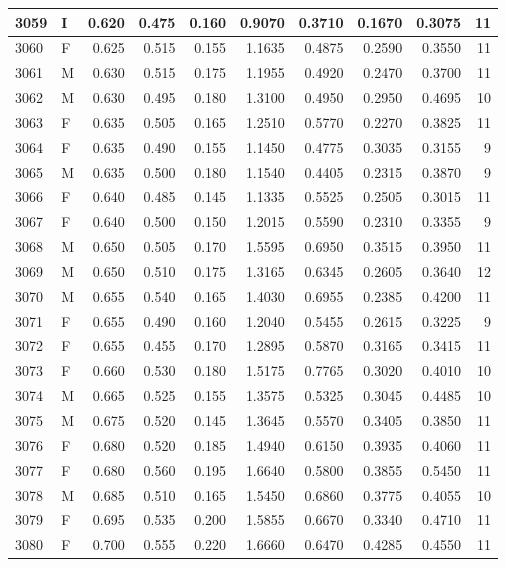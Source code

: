\documentclass[9pt,twocolumn,twoside,]{pnas-new}
\begin{document}
\begin{tabular}{l|l|r|r|r|r|r|r|r|r}
\hline
3059 & I & 0.620 & 0.475 & 0.160 & 0.9070 & 0.3710 & 0.1670 & 0.3075 & 11\\
\hline
3060 & F & 0.625 & 0.515 & 0.155 & 1.1635 & 0.4875 & 0.2590 & 0.3550 & 11\\
\hline
3061 & M & 0.630 & 0.515 & 0.175 & 1.1955 & 0.4920 & 0.2470 & 0.3700 & 11\\
\hline
3062 & M & 0.630 & 0.495 & 0.180 & 1.3100 & 0.4950 & 0.2950 & 0.4695 & 10\\
\hline
3063 & F & 0.635 & 0.505 & 0.165 & 1.2510 & 0.5770 & 0.2270 & 0.3825 & 11\\
\hline
3064 & F & 0.635 & 0.490 & 0.155 & 1.1450 & 0.4775 & 0.3035 & 0.3155 & 9\\
\hline
3065 & M & 0.635 & 0.500 & 0.180 & 1.1540 & 0.4405 & 0.2315 & 0.3870 & 9\\
\hline
3066 & F & 0.640 & 0.485 & 0.145 & 1.1335 & 0.5525 & 0.2505 & 0.3015 & 11\\
\hline
3067 & F & 0.640 & 0.500 & 0.150 & 1.2015 & 0.5590 & 0.2310 & 0.3355 & 9\\
\hline
3068 & M & 0.650 & 0.505 & 0.170 & 1.5595 & 0.6950 & 0.3515 & 0.3950 & 11\\
\hline
3069 & M & 0.650 & 0.510 & 0.175 & 1.3165 & 0.6345 & 0.2605 & 0.3640 & 12\\
\hline
3070 & M & 0.655 & 0.540 & 0.165 & 1.4030 & 0.6955 & 0.2385 & 0.4200 & 11\\
\hline
3071 & F & 0.655 & 0.490 & 0.160 & 1.2040 & 0.5455 & 0.2615 & 0.3225 & 9\\
\hline
3072 & F & 0.655 & 0.455 & 0.170 & 1.2895 & 0.5870 & 0.3165 & 0.3415 & 11\\
\hline
3073 & F & 0.660 & 0.530 & 0.180 & 1.5175 & 0.7765 & 0.3020 & 0.4010 & 10\\
\hline
3074 & M & 0.665 & 0.525 & 0.155 & 1.3575 & 0.5325 & 0.3045 & 0.4485 & 10\\
\hline
3075 & M & 0.675 & 0.520 & 0.145 & 1.3645 & 0.5570 & 0.3405 & 0.3850 & 11\\
\hline
3076 & F & 0.680 & 0.520 & 0.185 & 1.4940 & 0.6150 & 0.3935 & 0.4060 & 11\\
\hline
3077 & F & 0.680 & 0.560 & 0.195 & 1.6640 & 0.5800 & 0.3855 & 0.5450 & 11\\
\hline
3078 & M & 0.685 & 0.510 & 0.165 & 1.5450 & 0.6860 & 0.3775 & 0.4055 & 10\\
\hline
3079 & F & 0.695 & 0.535 & 0.200 & 1.5855 & 0.6670 & 0.3340 & 0.4710 & 11\\
\hline
3080 & F & 0.700 & 0.555 & 0.220 & 1.6660 & 0.6470 & 0.4285 & 0.4550 & 11\\

\end{tabular}
\end{document}
